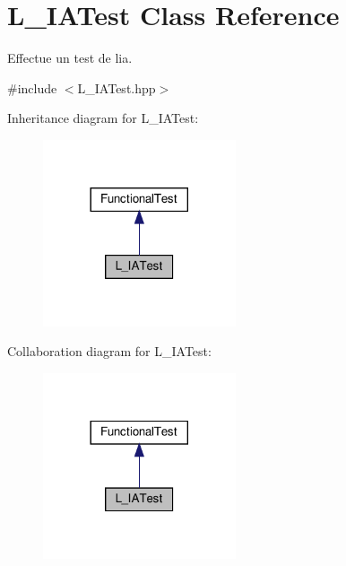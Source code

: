\hypertarget{classL__IATest}{}\section{L\+\_\+\+I\+A\+Test Class Reference}
\label{classL__IATest}


Effectue un test de l\textquotesingle{}ia.  




{\ttfamily \#include $<$L\+\_\+\+I\+A\+Test.\+hpp$>$}



Inheritance diagram for L\+\_\+\+I\+A\+Test\+:
\nopagebreak
\begin{figure}[H]
\begin{center}
\leavevmode
\includegraphics[width=161pt]{classL__IATest__inherit__graph}
\end{center}
\end{figure}


Collaboration diagram for L\+\_\+\+I\+A\+Test\+:
\nopagebreak
\begin{figure}[H]
\begin{center}
\leavevmode
\includegraphics[width=161pt]{classL__IATest__coll__graph}
\end{center}
\end{figure}
